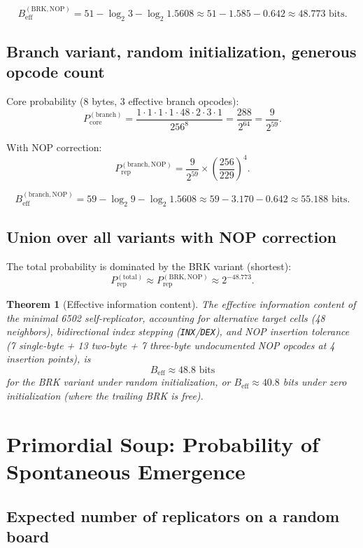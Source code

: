 \documentclass{article}
\newcommand{\opcode}[1]{\texttt{#1}}
\newcommand{\Beff}{B_{\mathrm{eff}}}
\newcommand{\Prep}{P_{\mathrm{rep}}}
\newtheorem{theorem}{Theorem}
\begin{document}
\[
  \Beff^{(\mathrm{BRK,NOP})} = 51 - \log_2 3 - \log_2 1.5608 \approx 51 - 1.585 - 0.642 \approx 48.773 \text{ bits}.
\]

\subsection{Branch variant, random initialization, generous opcode count}

Core probability (8 bytes, 3 effective branch opcodes):
\[
  P_{\mathrm{core}}^{(\mathrm{branch})} = \frac{1 \cdot 1 \cdot 1 \cdot 1 \cdot 48 \cdot 2 \cdot 3 \cdot 1}{256^8} = \frac{288}{2^{64}} = \frac{9}{2^{59}}.
\]

With NOP correction:
\[
  \Prep^{(\mathrm{branch,NOP})} = \frac{9}{2^{59}} \times \left(\frac{256}{229}\right)^4.
\]

\[
  \Beff^{(\mathrm{branch,NOP})} = 59 - \log_2 9 - \log_2 1.5608 \approx 59 - 3.170 - 0.642 \approx 55.188 \text{ bits}.
\]

\subsection{Union over all variants with NOP correction}

The total probability is dominated by the BRK variant (shortest):
\[
  \Prep^{(\mathrm{total})} \approx \Prep^{(\mathrm{BRK,NOP})} \approx 2^{-48.773}.
\]

\begin{theorem}[Effective information content]
\label{thm:beff}
The effective information content of the minimal 6502 self-replicator,
accounting for alternative target cells (48 neighbors), bidirectional
index stepping (\opcode{INX}/\opcode{DEX}), and NOP insertion tolerance
(7 single-byte + 13 two-byte + 7 three-byte undocumented NOP opcodes
at 4 insertion points), is
\[
  \boxed{\Beff \approx 48.8 \text{ bits}}
\]
for the BRK variant under random initialization, or
$\Beff \approx 40.8$ bits under zero initialization (where the trailing
BRK is free).
\end{theorem}

\section{Primordial Soup: Probability of Spontaneous Emergence}
\label{sec:primordial}

\subsection{Expected number of replicators on a random board}
\end{document}
